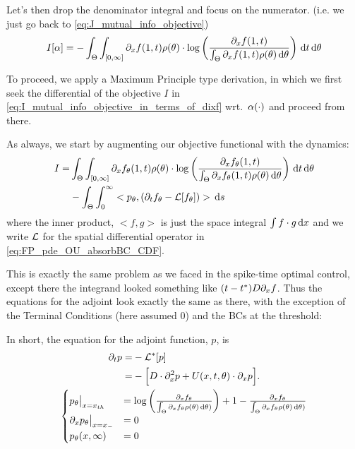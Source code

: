Let's then drop the denominator integral and focus on the numerator. (i.e. we
just go back to \cref{eq:J_mutual_info_objective})
\begin{equation}
I[\alpha] 
=  -
\int_\Theta \int_{[0, \infty]} {\partial}_xf(1, t)  \rho({ \theta}) \cdot 
\log \left( \frac{ {\partial}_xf(1, t)}{\int_\Theta {\partial}_xf(1, t)\rho({ \theta}) \, \mathrm{d} { \theta}
} \right)
\, \mathrm{d} t\, \mathrm{d} { \theta}
\label{eq:I_mutual_info_objective_in_terms_of_dixf} 
\end{equation}

To proceed, we apply a Maximum Principle type derivation, in which we first seek
the differential of the objective $I$ in
\cref{eq:I_mutual_info_objective_in_terms_of_dixf} wrt.\
$\alpha(\cdot)$ and proceed from there.   

As always, we start by augmenting our objective functional with the
dynamics:
\begin{align}
I=&  
\int_\Theta \int_{[0, \infty]} {\partial}_xf_{ \theta}(1, t)  \rho({ \theta}) \cdot 
\log \left( \frac{{\partial}_xf_{ \theta}(1, t)}{\int_\Theta {\partial}_xf_{ \theta}(1, t)\rho({ \theta})
\, \mathrm{d} { \theta} } \right)
\, \mathrm{d} t\, \mathrm{d} { \theta} 
\\
	  &- \int_\Theta \int_0^\infty <p_{ \theta}, ({\partial}_t f_{ \theta} - { \mathcal{L} }[f_{ \theta}])> \, \mathrm{d} s 
\end{align}
where the inner product, $<f, g>$ is just the space integral $\int f\cdot g
\, \mathrm{d} x$ and we write ${ \mathcal{L} }$ for the spatial differential operator in 
\cref{eq:FP_pde_OU_absorbBC_CDF}.

This is exactly the same problem as we faced in the spike-time optimal control,
except there the integrand looked something like $(t-t^*)D{\partial}_xf$. Thus the
equations for the adjoint look exactly the same as there, with the exception of the Terminal
Conditions (here assumed 0) and the BCs at the threshold:



In short, the equation for the adjoint function, $p$, is
\begin{equation}
\begin{gathered}
\begin{aligned}
{\partial}_t p =& - { { \mathcal{L} }^* }[p]
\\
		=&
			- \Big[ D\cdot {\partial}^2_x p +
			 U(x,t,{ \theta})   \cdot {\partial}_x p \Big].
\end{aligned}
\\
\begin{cases}
	p_{ \theta} \big|_{x={ x_{th} }} &=  \log\left(\frac{{\partial}_xf_{ \theta}}{\int_{\Theta}
	{\partial}_xf_{ \theta} \rho({ \theta})\, \mathrm{d} { \theta})}\right) +
	 1 -
	  \frac{{\partial}_xf_{ \theta}}{\int_{\Theta}
	{\partial}_xf_{ \theta} \rho({ \theta})\, \mathrm{d} { \theta})}
	\\
	{\partial}_x p_{ \theta}  \big|_{x={ x_{-} }} &= 0
	\\
	p_{ \theta}(x,\infty) &= 0
\end{cases}
\label{eq:adjoint_pde_OU}
\end{gathered}
\end{equation}

